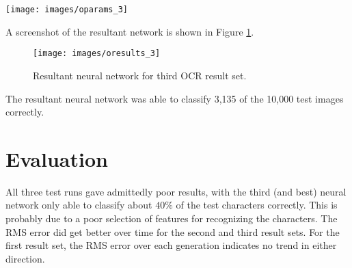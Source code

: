 \begin{center}
\texttt{[image: images/oparams\_3]}
\end{center}

A screenshot of the resultant network is shown in Figure \ref{oresults_3}.

\begin{figure}[hbt!]
  \centering
  \texttt{[image: images/oresults\_3]}
  \caption{Resultant neural network for third OCR result set.}
  \label{oresults_3}
\end{figure}

The resultant neural network was able to classify 3,135 of the 10,000
test images correctly.

\section{Evaluation}
All three test runs gave admittedly poor results, with the third (and
best) neural network only able to classify about $40\%$ of the test
characters correctly.
This is probably due to a poor selection of features for recognizing
the characters.
The RMS error did get better over time for the second and third result
sets.
For the first result set, the RMS error over each generation indicates
no trend in either direction.
